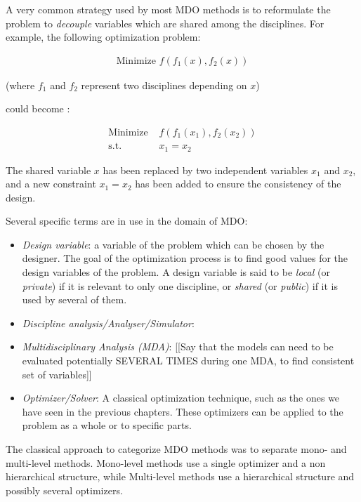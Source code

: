 A very common strategy used by most MDO methods is to reformulate the problem to \emph{decouple} variables which are shared among the disciplines. 
For example, the following optimization problem:

\begin{align*}
\text{Minimize } f(f_1(x), f_2(x))
\end{align*}

(where $f_1$ and $f_2$ represent two disciplines depending on $x$)

could become :

\begin{align*}
\text{Minimize } &f(f_1(x_1), f_2(x_2))\\
\text{s.t. } &x_1=x_2
\end{align*}

The shared variable $x$ has been replaced by two independent variables $x_1$ and $x_2$, and a new constraint $x_1=x_2$ has been added to ensure the consistency of the design.


Several specific terms are in use in the domain of MDO:

\begin{itemize}

\item \emph{Design variable}: a variable of the problem which can be chosen by the designer. The goal of the optimization process is to find good values for the design variables of the problem. A design variable is said to be \emph{local} (or \emph{private}) if it is relevant to only one discipline, or \emph{shared} (or \emph{public}) if it is used by several of them.

\item \emph{Discipline analysis/Analyser/Simulator}: 

\item \emph{Multidisciplinary Analysis (MDA)}: [[Say that the models can need to be evaluated potentially SEVERAL TIMES during one MDA, to find consistent set of variables]]

\item \emph{Optimizer/Solver}: A classical optimization technique, such as the ones we have seen in the previous chapters. These optimizers can be applied to the problem as a whole or to specific parts.

\end{itemize}



The classical approach to categorize MDO methods was to separate mono- and multi-level methods.
Mono-level methods use a single optimizer and a non hierarchical structure, while Multi-level methods use a hierarchical structure and possibly several optimizers.

